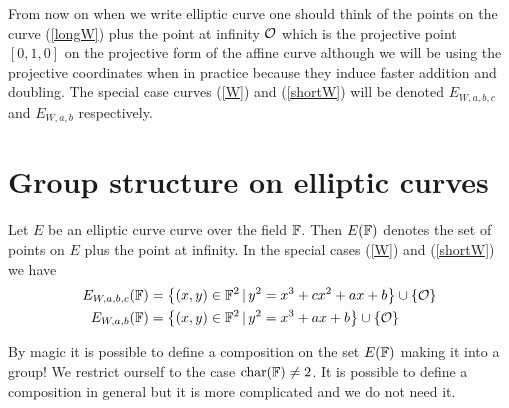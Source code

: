 From now on when we write elliptic curve one should think of the points on the curve (\ref{longW}) plus the point at infinity $\mathcal{O}$ which is the projective point $[0,1,0]$ on the projective form of the affine curve although we will be using the projective coordinates when in practice because they induce faster addition and doubling. The special case curves (\ref{W}) and (\ref{shortW}) will be denoted $E_{W,a,b,c}$ and $E_{W,a,b}$ respectively.

\section{Group structure on elliptic curves}\label{sec:ECGroup}
\begin{defn}\label{def:setPoints}
Let $E$ be an elliptic curve curve over the field $\mathbb{F}$. Then $E(\mathbb{F})$ denotes the set of points on $E$ plus the point at infinity. In the special cases (\ref{W}) and (\ref{shortW}) we have
\begin{align*}
E_{W,a,b,c}(\mathbb{F})& =\left\{ (x,y)\in\mathbb{F}^2\,\vert\, y^2=x^3+cx^2+ax+b\right\}\cup\{\mathcal{O}\} \\
E_{W,a,b}(\mathbb{F})& =\left\{ (x,y)\in\mathbb{F}^2\,\vert\, y^2=x^3+ax+b\right\} \cup\{\mathcal{O}\}
\end{align*} 
\end{defn}
By magic it is possible to define a composition on the set $E(\mathbb{F})$ making it into a group! We restrict ourself to the case $\text{char}(\mathbb{F})\neq 2$. It is possible to define a composition in general but it is more complicated and we do not need it. 

